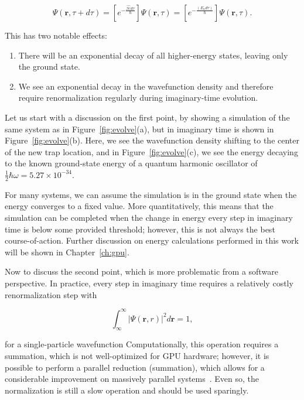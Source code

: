 \begin{equation}
\Psi(\mathbf{r},\tau + d\tau) = \left[e^{-\frac{\mathcal{\hat{H}}d\tau}{\hbar}}\right]\Psi(\mathbf{r},\tau) = \left[e^{-\frac{(E_n d\tau)}{\hbar}}\right]\Psi(\mathbf{r},\tau).
\end{equation}

\noindent This has two notable effects:
\begin{enumerate}
\item There will be an exponential decay of all higher-energy states, leaving only the ground state.
\item We see an exponential decay in the wavefunction density and therefore require renormalization regularly during imaginary-time evolution.
\end{enumerate}
Let us start with a discussion on the first point, by showing a simulation of the same system as in Figure~\ref{fig:evolve}(a), but in imaginary time is shown in Figure~\ref{fig:evolve}(b).
Here, we see the wavefunction density shifting to the center of the new trap location, and
in Figure~\ref{fig:evolve}(c), we see the energy decaying to the known ground-state energy of a quantum harmonic oscillator of $\frac{1}{2}\hbar\omega = 5.27\times 10^{-34}$.

For many systems, we can assume the simulation is in the ground state when the energy converges to a fixed value.
More quantitatively, this means that the simulation can be completed when the change in energy every step in imaginary time is below some provided threshold; however, this is not always the best course-of-action.
Further discussion on energy calculations performed in this work will be shown in Chapter~\ref{ch:gpu}.

Now to discuss the second point, which is more problematic from a software perspective.
In practice, every step in imaginary time requires a relatively costly renormalization step with

\begin{equation}
    \label{eqn:norm}
    \int_\infty^\infty |\Psi(\mathbf{r},r)|^2 d\mathbf{r} = 1,
\end{equation}

\noindent for a single-particle wavefunction
Computationally, this operation requires a summation, which is not well-optimized for GPU hardware; however, it is possible to perform a parallel reduction (summation), which allows for a considerable improvement on massively parallel systems~\cite{harris2007}.
Even so, the normalization is still a slow operation and should be used sparingly.

